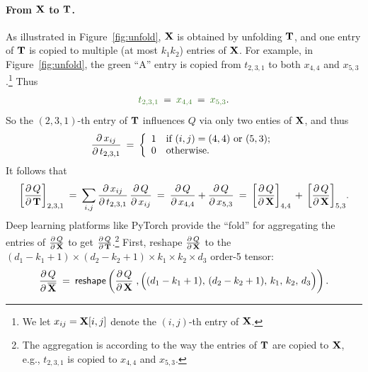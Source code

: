 \documentclass[11pt]{article}
\numberwithin{equation}{section}
\def\T{{\bf T}}
\def\X{{\bf X}}
\begin{document}
\paragraph{From $\X$ to $\T$.}
As illustrated in Figure~\ref{fig:unfold}, $\X$ is obtained by \textsf{unfolding} $\T$,
and one entry of $\T$ is copied to multiple (at most $k_1k_2$) entries of $\X$.
For example, in Figure~\ref{fig:unfold}, the \textcolor{OliveGreen}{green ``A''} entry is copied from $t_{2,3,1}$ to both $x_{4,4}$ and $x_{5,3}$.\footnote{We let $x_{ij} = \X[i,j]$ denote the $(i,j)$-th entry of $\X$.}
Thus
\begin{equation} \label{eq:t_x_1}
     \textcolor{OliveGreen}{t_{2,3,1}} 
     \: = \: 
     \textcolor{OliveGreen}{x_{4,4}} 
     \: = \: 
     \textcolor{OliveGreen}{x_{5,3}} .
\end{equation}
So the $(2,3,1)$-th entry of $\T$ influences $Q$ via only two enties of $\X$, and thus
\begin{equation*}
    \frac{\partial \, x_{ij}}{\partial \, t_{2,3,1}} 
    \: = \:
    \left\{
    \begin{array}{c l}
         1 & \textrm{if } (i,j)=(4,4) \textrm{ or } (5,3);  \\
         0 & \textrm{otherwise}. \\ 
    \end{array}
    \right.
\end{equation*}
It follows that
\begin{equation} \label{eq:t_x_2}
    \bigg[\frac{\partial \, Q}{\partial \, \T} \bigg]_{2, 3, 1}
    \: = \: \sum_{i, j}  \frac{\partial \, x_{ij}}{\partial \, t_{2,3,1}} \, \frac{\partial \, Q}{\partial \, x_{ij}} 
    \: = \: \frac{\partial \, Q}{\partial \, x_{4,4}} + \frac{\partial \, Q}{\partial \, x_{5,3}}  
    \: = \: \bigg[\frac{\partial \, Q}{\partial \, \X} \bigg]_{4, 4} \, + \,\bigg[ \frac{\partial \, Q}{\partial \, \X} \bigg]_{5, 3} . 
\end{equation}
Deep learning platforms like PyTorch provide the ``\textsf{fold}'' for aggregating the entries of $\frac{\partial \, Q}{\partial \, \X} $ to get $\frac{\partial \, Q}{\partial \, \T}$.\footnote{The aggregation is according to the way the entries of $\T$ are copied to $\X$, e.g., $t_{2,3,1}$ is copied to $x_{4,4}$ and $x_{5,3}$.}
First, \textsf{reshape} $\frac{\partial \, Q}{\partial \, \X} $ to the $(d_1 - k_1 + 1) \times (d_2 - k_2 + 1) \times k_1 \times k_2 \times d_3$ order-5 tensor:
\begin{equation*}
    \frac{\partial \, Q}{\partial \, \overline{\X}}  \:= \: \textsf{reshape} \left( \frac{\partial \, Q}{\partial \, \X}  \; , \Big( (d_1 - k_1 + 1) , \, (d_2 - k_2 + 1) , \, k_1 , \, k_2 , \, d_3 \Big)  \right) .
\end{equation*}
\end{document}
